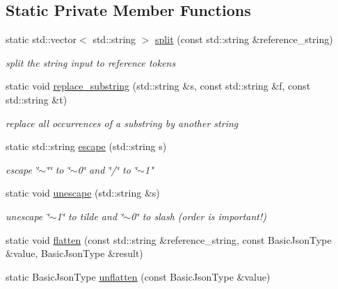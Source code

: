 \subsection*{Static Private Member Functions}
\begin{DoxyCompactItemize}
\item 
static std\+::vector$<$ std\+::string $>$ \hyperlink{classnlohmann_1_1json__pointer_ae01c32c6a071c2e5198d5dfcce290e50}{split} (const std\+::string \&reference\+\_\+string)
\begin{DoxyCompactList}\small\item\em split the string input to reference tokens \end{DoxyCompactList}\item 
static void \hyperlink{classnlohmann_1_1json__pointer_aa7649d30da9fc10b0e20704a27aea2a9}{replace\+\_\+substring} (std\+::string \&s, const std\+::string \&f, const std\+::string \&t)
\begin{DoxyCompactList}\small\item\em replace all occurrences of a substring by another string \end{DoxyCompactList}\item 
static std\+::string \hyperlink{classnlohmann_1_1json__pointer_a8abf3577f9a0087f29a233893cdc73ad}{escape} (std\+::string s)
\begin{DoxyCompactList}\small\item\em escape \char`\"{}$\sim$\char`\"{}\char`\"{} to \char`\"{}$\sim$0\char`\"{} and \char`\"{}/\char`\"{} to \char`\"{}$\sim$1" \end{DoxyCompactList}\item 
static void \hyperlink{classnlohmann_1_1json__pointer_ab85442d5fbcc289b79beeefc2175446f}{unescape} (std\+::string \&s)
\begin{DoxyCompactList}\small\item\em unescape \char`\"{}$\sim$1\char`\"{} to tilde and \char`\"{}$\sim$0\char`\"{} to slash (order is important!) \end{DoxyCompactList}\item 
static void \hyperlink{classnlohmann_1_1json__pointer_ab0d7759d0caa6a0c0187916da28e6ee7}{flatten} (const std\+::string \&reference\+\_\+string, const Basic\+Json\+Type \&value, Basic\+Json\+Type \&result)
\item 
static Basic\+Json\+Type \hyperlink{classnlohmann_1_1json__pointer_a920065221e3c81676c3211c100d024a7}{unflatten} (const Basic\+Json\+Type \&value)
\end{DoxyCompactItemize}
